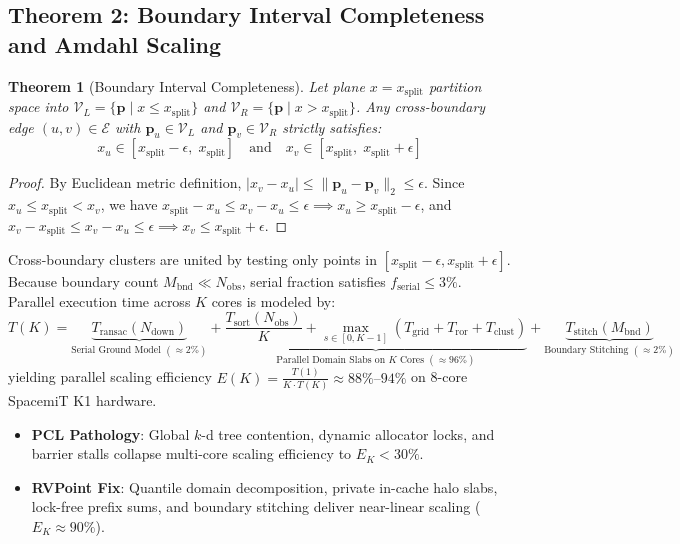 \documentclass[11pt,a4paper]{article}
\newtheorem{theorem}{Theorem}[section]
\begin{document}
\subsection{Theorem 2: Boundary Interval Completeness and Amdahl Scaling}
\label{sec:theorem_stitching_math}
\begin{theorem}[Boundary Interval Completeness]
\label{thm:theorem_stitching}
Let plane $x = x_{\text{split}}$ partition space into $\mathcal{V}_L = \{ \bm{p} \mid x \le x_{\text{split}} \}$ and $\mathcal{V}_R = \{ \bm{p} \mid x > x_{\text{split}} \}$. Any cross-boundary edge $(u, v) \in \mathcal{E}$ with $\bm{p}_u \in \mathcal{V}_L$ and $\bm{p}_v \in \mathcal{V}_R$ strictly satisfies:
\begin{equation}
x_u \in [x_{\text{split}} - \epsilon, \; x_{\text{split}}] \quad \text{and} \quad x_v \in [x_{\text{split}}, \; x_{\text{split}} + \epsilon]
\end{equation}
\end{theorem}
\begin{proof}
By Euclidean metric definition, $|x_v - x_u| \le \|\bm{p}_u - \bm{p}_v\|_2 \le \epsilon$. Since $x_u \le x_{\text{split}} < x_v$, we have $x_{\text{split}} - x_u \le x_v - x_u \le \epsilon \implies x_u \ge x_{\text{split}} - \epsilon$, and $x_v - x_{\text{split}} \le x_v - x_u \le \epsilon \implies x_v \le x_{\text{split}} + \epsilon$.
\end{proof}
Cross-boundary clusters are united by testing only points in $[x_{\text{split}} - \epsilon, x_{\text{split}} + \epsilon]$. Because boundary count $M_{\text{bnd}} \ll N_{\text{obs}}$, serial fraction satisfies $f_{\text{serial}} \le 3\%$. Parallel execution time across $K$ cores is modeled by:
\begin{equation}
T(K) = \underbrace{T_{\text{ransac}}(N_{\text{down}})}_{\text{Serial Ground Model } (\approx 2\%)} + \underbrace{\frac{T_{\text{sort}}(N_{\text{obs}})}{K} + \max_{s \in [0, K-1]} \left( T_{\text{grid}} + T_{\text{ror}} + T_{\text{clust}} \right)}_{\text{Parallel Domain Slabs on } K \text{ Cores } (\approx 96\%)} + \underbrace{T_{\text{stitch}}(M_{\text{bnd}})}_{\text{Boundary Stitching } (\approx 2\%)}
\end{equation}
yielding parallel scaling efficiency $E(K) = \frac{T(1)}{K \cdot T(K)} \approx 88\%\text{--}94\%$ on 8-core SpacemiT K1 hardware.

\begin{tcolorbox}[fixcmp, title={Stage Comparison: Multi-Core Scalability}]
\begin{itemize}[leftmargin=1.2em, itemsep=0.1em]
    \item \textbf{PCL Pathology}: Global $k$-d tree contention, dynamic allocator locks, and barrier stalls collapse multi-core scaling efficiency to $E_K < 30\%$.
    \item \textbf{RVPoint Fix}: Quantile domain decomposition, private in-cache halo slabs, lock-free prefix sums, and boundary stitching deliver near-linear scaling ($E_K \approx 90\%$).
\end{itemize}
\end{tcolorbox}
\end{document}
